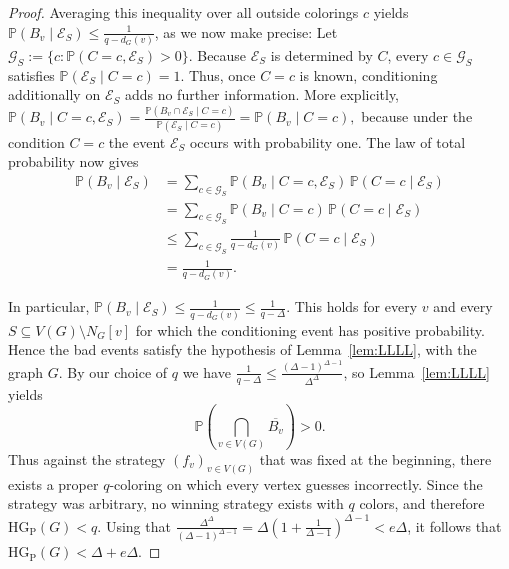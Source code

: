 \documentclass[a4paper,11pt]{amsproc}
\theoremstyle{plain}
\theoremstyle{definition}
\newcommand{\HGP}{\mathrm{HG_{P}}}
\newcommand{\Prob}{\mathbb{P}}
\begin{document}
\begin{proof}
Averaging this inequality over all outside colorings $c$ yields $\Prob(B_v\mid \mathcal E_S) \le\frac{1}{q-d_G(v)}$, as we now make precise: Let
  $\mathcal G_S :=
  \{c:\Prob(C=c,\mathcal E_S)>0\}$.
Because $\mathcal E_S$ is determined by $C$, every
$c\in\mathcal G_S$ satisfies $\Prob(\mathcal E_S\mid C=c)=1$.
Thus, once $C=c$ is known, conditioning additionally on $\mathcal E_S$
adds no further information.  More explicitly,
$
  \Prob(B_v\mid C=c,\mathcal E_S)
  =
  \frac{\Prob(B_v\cap\mathcal E_S\mid C=c)}
       {\Prob(\mathcal E_S\mid C=c)}
  =\Prob(B_v\mid C=c),
$
because under the condition $C=c$ the event $\mathcal E_S$ occurs with
probability one.  The law of total probability now gives
\begin{align*}
  \Prob(B_v\mid \mathcal E_S)
  &= \sum_{c\in\mathcal G_S}
     \Prob(B_v\mid C=c,\mathcal E_S)\,
     \Prob(C=c\mid \mathcal E_S)\\
  &=\sum_{c\in\mathcal G_S}
     \Prob(B_v\mid C=c)\,
     \Prob(C=c\mid \mathcal E_S)\\
  &\le\sum_{c\in\mathcal G_S}
     \frac{1}{q-d_G(v)} \,
     \Prob(C=c\mid \mathcal E_S)\\
  &=\frac{1}{q-d_G(v)}.
\end{align*}

In particular, $\Prob(B_v\mid \mathcal E_S)
  \le \frac{1}{q-d_G(v)}
  \le \frac{1}{q-\Delta}$.
This holds for every $v$ and every
$S\subseteq V(G)\setminus N_G[v]$ for which the conditioning event has
positive probability.  Hence the bad events satisfy the hypothesis of Lemma~\ref{lem:LLLL}, with the
graph $G$.  By our choice of $q$ we have $\frac{1}{q-\Delta}
  \le
  \frac{(\Delta-1)^{\Delta-1}}{\Delta^\Delta}$, so 
Lemma~\ref{lem:LLLL}  yields
$$\Prob \left(\bigcap_{v\in V(G)}\overline{B_v}\right)>0.$$
Thus against the strategy $(f_v)_{v\in V(G)}$ that was fixed at the beginning, there exists a proper $q$-coloring on which every vertex guesses
incorrectly.  Since the strategy was arbitrary, no winning strategy exists
with $q$ colors, and therefore $\HGP(G)<q$. 
Using that $ \frac{\Delta^\Delta}{(\Delta-1)^{\Delta-1}}
  = \Delta\left(1+\frac{1}{\Delta-1}\right)^{\Delta-1}  <e\Delta$,
it follows that $\HGP(G)<\Delta+e\Delta$.
\end{proof}
\end{document}
